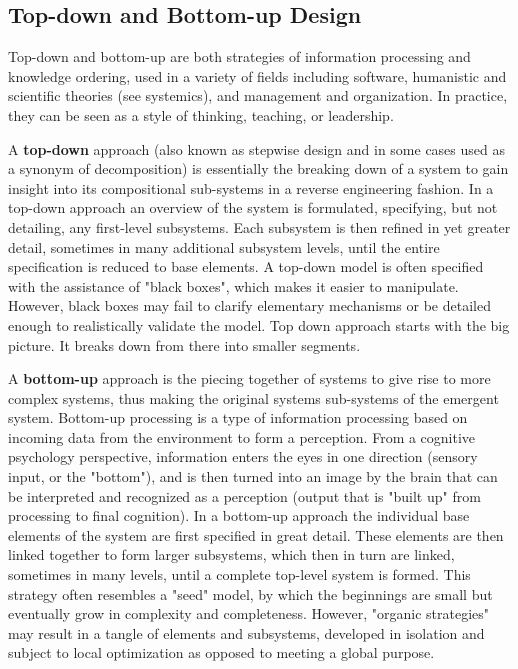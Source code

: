 \documentclass[12pt,a4paper,titlepage]{article}
\begin{document}
\subsection{Top-down and Bottom-up Design}
Top-down and bottom-up are both strategies of information processing and knowledge ordering, used in a variety of fields including software, humanistic and scientific theories (see systemics), and management and organization. In practice, they can be seen as a style of thinking, teaching, or leadership.\par
A \textbf{top-down} approach (also known as stepwise design and in some cases used as a synonym of decomposition) is essentially the breaking down of a system to gain insight into its compositional sub-systems in a reverse engineering fashion. In a top-down approach an overview of the system is formulated, specifying, but not detailing, any first-level subsystems. Each subsystem is then refined in yet greater detail, sometimes in many additional subsystem levels, until the entire specification is reduced to base elements. A top-down model is often specified with the assistance of "black boxes", which makes it easier to manipulate. However, black boxes may fail to clarify elementary mechanisms or be detailed enough to realistically validate the model. Top down approach starts with the big picture. It breaks down from there into smaller segments.\par
A \textbf{bottom-up} approach is the piecing together of systems to give rise to more complex systems, thus making the original systems sub-systems of the emergent system. Bottom-up processing is a type of information processing based on incoming data from the environment to form a perception. From a cognitive psychology perspective, information enters the eyes in one direction (sensory input, or the "bottom"), and is then turned into an image by the brain that can be interpreted and recognized as a perception (output that is "built up" from processing to final cognition). In a bottom-up approach the individual base elements of the system are first specified in great detail. These elements are then linked together to form larger subsystems, which then in turn are linked, sometimes in many levels, until a complete top-level system is formed. This strategy often resembles a "seed" model, by which the beginnings are small but eventually grow in complexity and completeness. However, "organic strategies" may result in a tangle of elements and subsystems, developed in isolation and subject to local optimization as opposed to meeting a global purpose.\par
\end{document}
